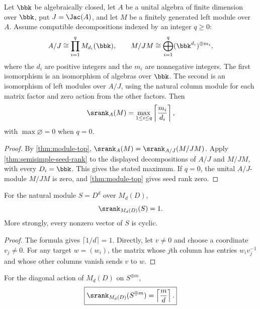 \begin{corollary}
\label{cor:algebraically-closed-formula}
Let $\bbk$ be algebraically closed, let $A$ be a unital algebra of finite dimension over $\bbk$, put $J=\Jac(A)$, and let $M$ be a finitely generated left module over $A$.  Assume compatible decompositions indexed by an integer $q\geq0$:
\[
A/J\cong\prod_{i=1}^{q}M_{d_i}(\bbk),
\qquad
M/JM\cong\bigoplus_{i=1}^{q}(\bbk^{d_i})^{\oplus m_i},
\]
where the $d_i$ are positive integers and the $m_i$ are nonnegative integers.  The first isomorphism is an isomorphism of algebras over $\bbk$.  The second is an isomorphism of left modules over $A/J$, using the natural column module for each matrix factor and zero action from the other factors.  Then
\[
\srank_A(M)=\max_{1\leq i\leq q}\left\lceil\frac{m_i}{d_i}\right\rceil,
\]
with $\max\varnothing=0$ when $q=0$.
\end{corollary}

\begin{proof}
By \cref{thm:module-top}, $\srank_A(M)=\srank_{A/J}(M/JM)$.  Apply \cref{thm:semisimple-seed-rank} to the displayed decompositions of $A/J$ and $M/JM$, with every $D_i=\bbk$.  This gives the stated maximum.  If $q=0$, the unital $A/J$-module $M/JM$ is zero, and \cref{thm:module-top} gives seed rank zero.
\end{proof}

\begin{corollary}
\label{cor:full-matrix}
For the natural module $S=D^d$ over $M_d(D)$,
\[
\srank_{M_d(D)}(S)=1.
\]
More strongly, every nonzero vector of $S$ is cyclic.
\end{corollary}

\begin{proof}
The formula gives $\lceil1/d\rceil=1$.  Directly, let $v\neq0$ and choose a coordinate $v_j\neq0$.  For any target $w=(w_i)$, the matrix whose $j$th column has entries $w_iv_j^{-1}$ and whose other columns vanish sends $v$ to $w$.
\end{proof}

\begin{corollary}
\label{cor:multiplicity-obstruction}
For the diagonal action of $M_d(D)$ on $S^{\oplus m}$,
\[
\boxed{
\srank_{M_d(D)}(S^{\oplus m})
=
\left\lceil\frac{m}{d}\right\rceil.
}
\]
\end{corollary}

